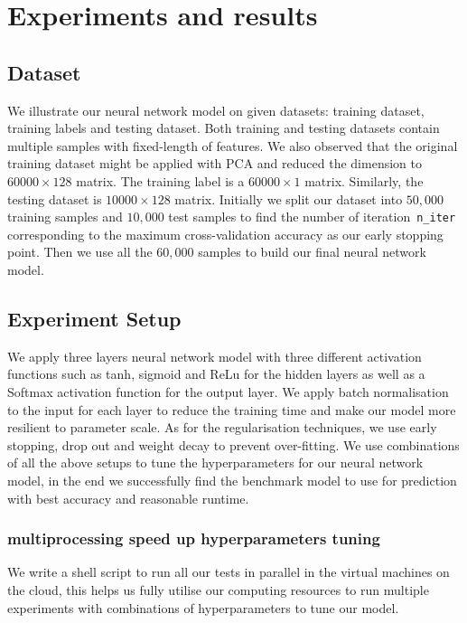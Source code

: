 \section{Experiments and results}\label{chapter4}

\subsection{Dataset}
We illustrate our neural network model on given datasets: training dataset, training labels and testing dataset.
Both training and testing datasets contain multiple samples with fixed-length of features.
We also observed that the original training dataset might be applied with PCA and reduced the dimension to $60000 \times 128$ matrix.
The training label is a $60000 \times 1$ matrix.
Similarly, the testing dataset is $10000 \times 128$ matrix.
Initially we split our dataset into $50,000$ training samples and $10,000$ test samples to find the number of iteration~\texttt{n\_iter} corresponding to the maximum cross-validation accuracy as our early stopping point.
Then we use all the $60,000$ samples to build our final neural network model.

\subsection{Experiment Setup}
We apply three layers neural network model with three different activation functions such as tanh, sigmoid and ReLu for the hidden layers as well as a Softmax activation function for the output layer.
We apply batch normalisation to the input for each layer to reduce the training time and make our model more resilient to parameter scale.
As for the regularisation techniques,
we use early stopping, drop out and weight decay to prevent over-fitting.
We use combinations of all the above setups to tune the hyperparameters for our neural network model,
in the end we successfully find the benchmark model to use for prediction with best accuracy and reasonable runtime.

\subsubsection{multiprocessing speed up hyperparameters tuning}
We write a shell script to run all our tests in parallel in the virtual machines on the cloud,
this helps us fully utilise our computing resources to run multiple experiments with combinations of hyperparameters to tune our model.

